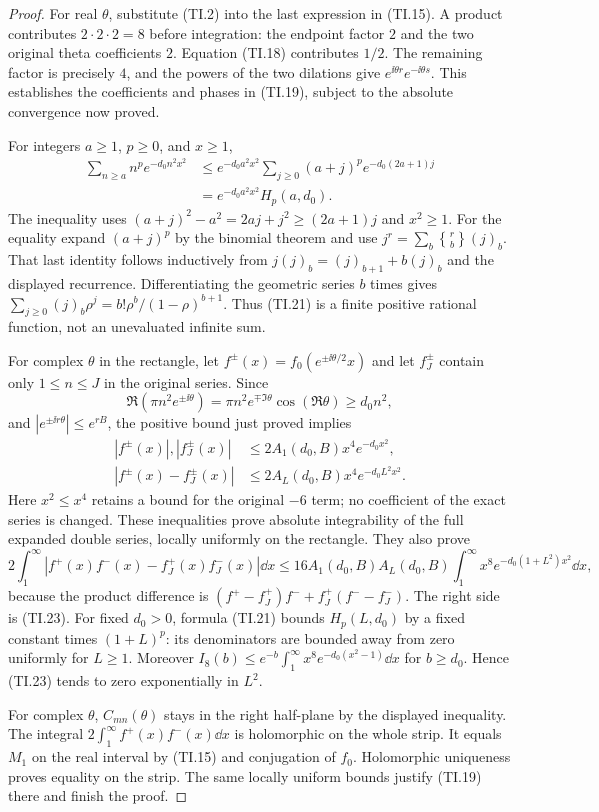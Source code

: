 \begin{proof}
For real $\theta$, substitute (TI.2) into the last expression in
(TI.15). A product contributes $2\cdot2\cdot2=8$ before integration:
the endpoint factor $2$ and the two original theta coefficients $2$.
Equation (TI.18) contributes $1/2$. The remaining factor is precisely
$4$, and the powers of the two dilations give
$e^{\ii\theta r}e^{-\ii\theta s}$. This establishes the coefficients
and phases in (TI.19), subject to the absolute convergence now proved.

For integers $a\ge1$, $p\ge0$, and $x\ge1$,
\begin{align*}
 \sum_{n\ge a}n^p e^{-d_0n^2x^2}
 &\le e^{-d_0a^2x^2}\sum_{j\ge0}(a+j)^p
          e^{-d_0(2a+1)j}\\
 &=e^{-d_0a^2x^2}H_p(a,d_0).
\end{align*}
The inequality uses $(a+j)^2-a^2=2aj+j^2\ge(2a+1)j$ and $x^2\ge1$.
For the equality expand $(a+j)^p$ by the binomial theorem and use
$j^r=\sum_b\genfrac{\{}{\}}{0pt}{}{r}{b}(j)_b$. That last identity follows inductively
from $j(j)_b=(j)_{b+1}+b(j)_b$ and the displayed recurrence.
Differentiating the geometric series $b$ times gives
$\sum_{j\ge0}(j)_b\rho^j=b!\rho^b/(1-\rho)^{b+1}$.
Thus (TI.21) is a finite positive rational function, not an unevaluated
infinite sum.

For complex $\theta$ in the rectangle, let
$f^\pm(x)=f_0(e^{\pm\ii\theta/2}x)$ and let $f_J^\pm$ contain only
$1\le n\le J$ in the original series. Since
\[
 \Re(\pi n^2e^{\pm\ii\theta})
 =\pi n^2e^{\mp\Im\theta}\cos(\Re\theta)\ge d_0n^2,
\]
and $|e^{\pm\ii r\theta}|\le e^{rB}$, the positive bound just proved
implies
\begin{align*}
 |f^\pm(x)|, |f_J^\pm(x)|
 &\le2A_1(d_0,B)x^4e^{-d_0x^2},\\
 |f^\pm(x)-f_J^\pm(x)|
 &\le2A_L(d_0,B)x^4e^{-d_0L^2x^2}.
\end{align*}
Here $x^2\le x^4$ retains a bound for the original $-6$ term;
no coefficient of the exact series is changed. These inequalities
prove absolute integrability of the full expanded double series,
locally uniformly on the rectangle. They also prove
\[
 2\int_1^\infty
 |f^+(x)f^-(x)-f_J^+(x)f_J^-(x)|\dd x
 \le16A_1(d_0,B)A_L(d_0,B)
 \int_1^\infty x^8e^{-d_0(1+L^2)x^2}\dd x,
\]
because the product difference is
$(f^+-f_J^+)f^-+f_J^+(f^--f_J^-)$.
The right side is (TI.23). For fixed $d_0>0$, formula (TI.21) bounds
$H_p(L,d_0)$ by a fixed constant times $(1+L)^p$: its denominators
are bounded away from zero uniformly for $L\ge1$. Moreover
$I_8(b)\le e^{-b}\int_1^\infty x^8e^{-d_0(x^2-1)}\dd x$ for
$b\ge d_0$. Hence (TI.23) tends to zero exponentially in $L^2$.

For complex $\theta$, $C_{mn}(\theta)$ stays in the right half-plane
by the displayed inequality. The integral
$2\int_1^\infty f^+(x)f^-(x)\dd x$ is holomorphic on the whole strip.
It equals $M_1$ on the real interval by (TI.15) and conjugation of
$f_0$. Holomorphic uniqueness proves equality on the strip. The same
locally uniform bounds justify (TI.19) there and finish the proof.
\end{proof}

